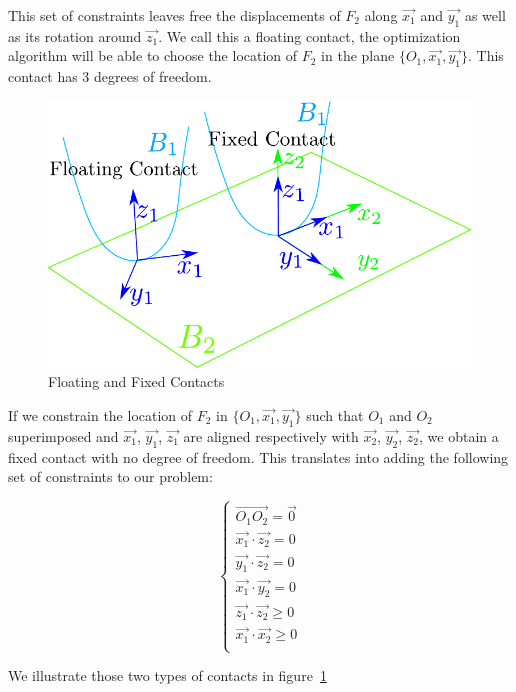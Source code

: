 This set of constraints leaves free the displacements of $F_2$ along $\vec{x_1}$ and $\vec{y_1}$ as well as its rotation around $\vec{z_1}$.
We call this a floating contact, the optimization algorithm will be able to choose the location of $F_2$ in the plane $\{O_1, \vec{x_1}, \vec{y_1}\}$. This contact has 3 degrees of freedom.

\begin{figure}[htpb]
  \centering
  \includegraphics[width=0.8\linewidth]{contactConstraint.pdf}
  \caption{Floating and Fixed Contacts}
\label{fig:contactConstraint}
\end{figure}

If we constrain the location of $F_2$ in $\{O_1, \vec{x_1}, \vec{y_1}\}$ such that $O_1$ and $O_2$ superimposed and $\vec{x_1}$, $\vec{y_1}$, $\vec{z_1}$ are aligned respectively with $\vec{x_2}$, $\vec{y_2}$, $\vec{z_2}$, we obtain a fixed contact with no degree of freedom. This translates into adding the following set of constraints to our problem:

\begin{equation}
\label{eq:fixed_contact}
\boxed{\left\{
  \begin{array}{l}
    \overrightarrow{O_1O_2} = \vec{0}\\
    \vec{x_1}\cdot\vec{z_2} = 0\\
    \vec{y_1}\cdot\vec{z_2} = 0\\
    \vec{x_1}\cdot\vec{y_2} = 0\\
    \vec{z_1}\cdot\vec{z_2} \geq 0\\
    \vec{x_1}\cdot\vec{x_2} \geq 0\\
  \end{array}
  \right.}
\end{equation}

We illustrate those two types of contacts in figure~\ref{fig:contactConstraint}


